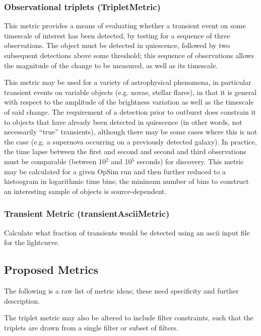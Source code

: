 \subsubsection{Observational triplets (TripletMetric)}

This metric provides a means of evaluating whether a transient event on some timescale of interest has been detected, by testing for a sequence of three observations. The object must be detected in quiescence, followed by two subsequent detections above some threshold; this sequence of observations allows the magnitude of the change to be measured, as well as its timescale.

This metric may be used for a variety of astrophysical phenomena, in particular transient events on variable objects (e.g. novae, stellar flares), in that it is general with respect to the amplitude of the brightness variation as well as the timescale of said change. The requirement of a detection prior to outburst does constrain it to objects that have already been detected in quiescence (in other words, not necessarily ``true'' transients), although there may be some cases where this is not the case (e.g. a supernova occurring on a previously detected galaxy). In practice, the time lapse between the first and second and second and third observations must be comparable (between 10$^2$ and 10$^5$ seconds) for discovery. This metric may be calculated for a given OpSim run and then further reduced to a histoogram in logarithmic time bins; the minimum number of bins to construct an interesting sample of objects is source-dependent.

\subsubsection{Transient Metric (transientAsciiMetric)}

Calculate what fraction of transients would be detected using an ascii input file for the lightcurve.

\subsection{Proposed Metrics}

The following is a raw list of metric ideas; these need specificity and further description.

The triplet metric may also be altered to include filter constraints, such that the triplets are drawn from a single filter or subset of filters.

